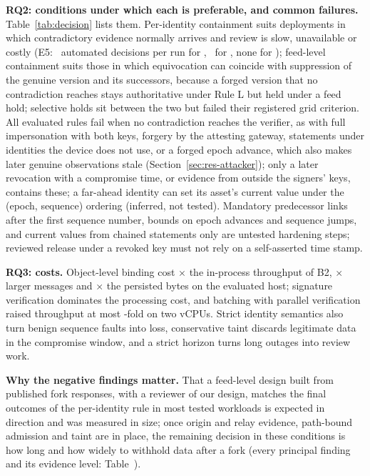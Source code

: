 \textbf{RQ2: conditions under which each is preferable, and common failures.} Table~\ref{tab:decision} lists them. Per-identity containment suits deployments in which contradictory evidence normally arrives and review is slow, unavailable or costly (E5: \XPrimEfiveBFivehistDEC\ automated decisions per run for \Bhist, \XPrimEfiveBFiveeventDEC\ for \Bev, none for \sys); feed-level containment suits those in which equivocation can coincide with suppression of the genuine version and its successors, because a forged version that no contradiction reaches stays authoritative under Rule L but held under a feed hold; selective holds sit between the two but failed their registered grid criterion. All evaluated rules fail when no contradiction reaches the verifier, as with full impersonation with both keys, forgery by the attesting gateway, statements under identities the device does not use, or a forged epoch advance, which also makes later genuine observations stale (Section~\ref{sec:res-attacker}); only a later revocation with a compromise time, or evidence from outside the signers' keys, contains these; a far-ahead identity can set its asset's current value under the (epoch, sequence) ordering (inferred, not tested). Mandatory predecessor links after the first sequence number, bounds on epoch advances and sequence jumps, and current values from chained statements only are untested hardening steps; reviewed release under a revoked key must not rely on a self-asserted time stamp.

\textbf{RQ3: costs.} Object-level binding cost \RTpRatioBTwo$\times$ the in-process throughput of B2, \RWireRatioBTwo$\times$ larger messages and \RDbRatioBTwo$\times$ the persisted bytes on the evaluated host; signature verification dominates the processing cost, and batching with parallel verification raised throughput at most \VBtPBTIbestgain-fold on two vCPUs. Strict identity semantics also turn benign sequence faults into loss, conservative taint discards legitimate data in the compromise window, and a strict horizon turns long outages into review work.

\textbf{Why the negative findings matter.} That a feed-level design built from published fork responses, with a reviewer of our design, matches the final outcomes of the per-identity rule in most tested workloads is expected in direction and was measured in size; once origin and relay evidence, path-bound admission and taint are in place, the remaining decision in these conditions is how long and how widely to withhold data after a fork (every principal finding and its evidence level: Table~).

